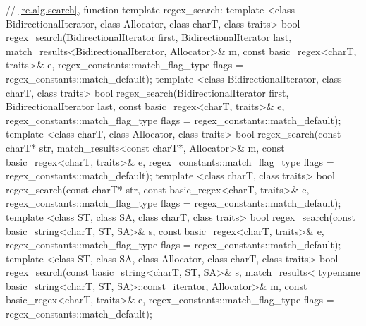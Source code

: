 \begin{codeblock}
{  // \ref{re.alg.search}, function template regex_search:
  template <class BidirectionalIterator, class Allocator,
      class charT, class traits>
    bool regex_search(BidirectionalIterator first, BidirectionalIterator last,
                      match_results<BidirectionalIterator, Allocator>& m,
                      const basic_regex<charT, traits>& e,
                      regex_constants::match_flag_type flags =
                        regex_constants::match_default);
  template <class BidirectionalIterator, class charT, class traits>
    bool regex_search(BidirectionalIterator first, BidirectionalIterator last,
                      const basic_regex<charT, traits>& e,
                      regex_constants::match_flag_type flags =
                        regex_constants::match_default);
  template <class charT, class Allocator, class traits>
    bool regex_search(const charT* str,
                      match_results<const charT*, Allocator>& m,
                      const basic_regex<charT, traits>& e,
                      regex_constants::match_flag_type flags =
                        regex_constants::match_default);
  template <class charT, class traits>
    bool regex_search(const charT* str,
                      const basic_regex<charT, traits>& e,
                      regex_constants::match_flag_type flags =
                        regex_constants::match_default);
  template <class ST, class SA, class charT, class traits>
    bool regex_search(const basic_string<charT, ST, SA>& s,
                      const basic_regex<charT, traits>& e,
                      regex_constants::match_flag_type flags =
                        regex_constants::match_default);
  template <class ST, class SA, class Allocator, class charT, class traits>
    bool regex_search(const basic_string<charT, ST, SA>& s,
                      match_results<
                        typename basic_string<charT, ST, SA>::const_iterator, 
                        Allocator>& m,
                      const basic_regex<charT, traits>& e,
                      regex_constants::match_flag_type flags =
                        regex_constants::match_default);

}
\end{codeblock}
